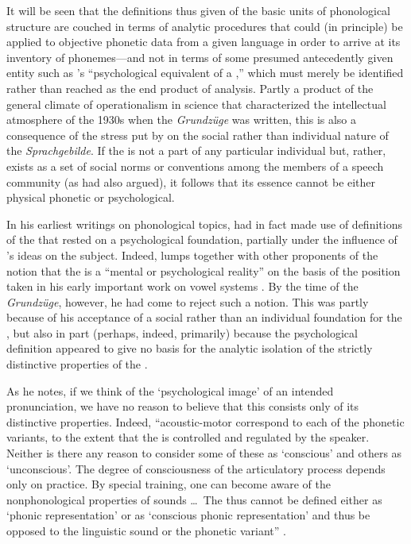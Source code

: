 It will be seen that the definitions thus given of the basic units of
phonological structure are couched in terms of analytic procedures
that could (in principle) be applied to objective phonetic data from a
given language in order to arrive at its inventory of phonemes—and not
in terms of some presumed antecedently given entity such as {\Baudouin}'s
``psychological equivalent of a ,'' which must merely be
identified rather than reached as the end product of analysis. Partly
a product of the general climate of operationalism in science that
characterized the intellectual atmosphere of the 1930s when the
\textsl{Grundzüge} was written, this is also a consequence of the
{stress} put by {\Trubetzkoy} on the social rather than individual nature
of the \emph{Sprachgebilde}. If the  is not a part of
any particular individual but, rather, exists as a set of social norms
or conventions among the members of a speech community (as {\Saussure}
had also argued), it follows that its essence cannot be either
physical phonetic or psychological.

In his earliest writings on phonological topics, {\Trubetzkoy} had in
fact made use of definitions of the  that rested on a
psychological foundation, partially under the influence of 
{\DeCourtenay}'s ideas on the subject. Indeed,
\citet{twaddell35:on.defining} lumps {\Trubetzkoy} together with other
proponents of the notion that the  is a ``mental or
psychological reality'' on the basis of the position taken in his early
important work on vowel systems \citep{trubetzkoy29:vowel.systems}. By
the time of the \textsl{Grundzüge}, however, he had come to reject
such a notion. This was partly because of his acceptance of a social
rather than an individual foundation for the , but
also in part (perhaps, indeed, primarily) because the psychological
definition appeared to give no basis for the analytic isolation of the
strictly distinctive properties of the .

As he notes, if we think of the `psychological image' of an intended
pronunciation, we have no reason to believe that this consists only of
its distinctive properties. Indeed, ``acoustic-motor 
correspond to each of the phonetic variants, to the extent that the
 is controlled and regulated by the speaker. Neither is
there any reason to consider some of these  as
`conscious' and others as `unconscious'. The degree of consciousness
of the articulatory process depends only on practice. By special
training, one can become aware of the nonphonological properties of
sounds \ldots\ The  thus cannot be defined either as `phonic
representation' or as `conscious phonic representation' and thus be
opposed to the linguistic sound or the phonetic variant''
\citep[142]{trubetzkoy39:grundzuge}.

